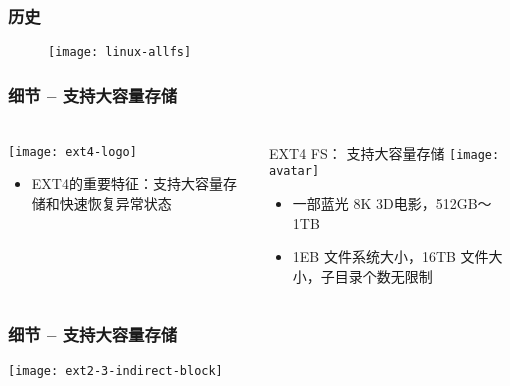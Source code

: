 \begin{frame}[fragile]
	\frametitle{历史}
	\begin{figure}
		\texttt{[image: linux-allfs]}
	\end{figure}

\end{frame}



\begin{frame}[fragile]
	\frametitle{细节 -- 支持大容量存储}
	
	\frametitle{ }
	\begin{columns}[t]
		\begin{column}{.3\textwidth}
			
			\texttt{[image: ext4-logo]}
			\begin{itemize}
				\item EXT4的重要特征：支持大容量存储和快速恢复异常状态
				
			\end{itemize}
			
		\end{column}
		
		\begin{column}{.7\textwidth}			
			EXT4 FS： 支持大容量存储
			\texttt{[image: avatar]}
			\begin{itemize}
				\item 一部蓝光 8K 3D电影，512GB～1TB
				\item 1EB 文件系统大小，16TB 文件大小，子目录个数无限制
			\end{itemize}
			
		\end{column}
	\end{columns}
	
\end{frame}


\begin{frame}[fragile]
	\frametitle{细节 -- 支持大容量存储}
	\centering
    \texttt{[image: ext2-3-indirect-block]}
	
\end{frame}

